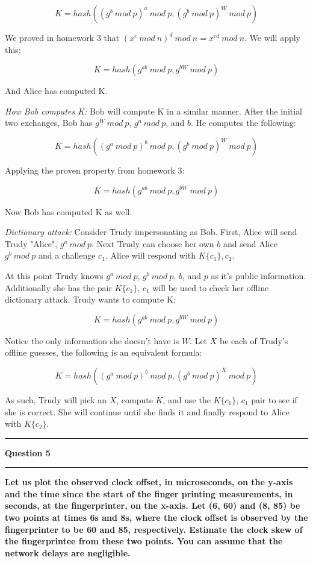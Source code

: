\documentclass[11pt]{article}
\newcommand\question[2]{\vspace{.25in}\hrule\textbf{#1}\vspace{.5em}\hrule\vspace{.10in}}
\renewcommand\part[1]{\vspace{.10in}\textbf{(#1)}}
\begin{document}
$$K = hash((g^b \ mod \ p)^a \ mod \ p, (g^b \ mod \ p)^W \ mod \ p)$$

We proved in homework 3 that $(x^c \ mod \ n)^d \ mod \ n = x^{cd} \ mod \ n$. We will apply this:

$$K = hash(g^{ab} \ mod \ p, g^{bW} \ mod \ p)$$

And Alice has computed K.

\textit{How Bob computes K:} Bob will compute K in a similar manner. After the initial two exchanges, Bob has $g^W \ mod \ p$, $g^a \ mod \ p$, and $b$. He computes the following:

$$K = hash((g^a \ mod \ p)^b \ mod \ p, (g^b \ mod \ p)^W \ mod \ p)$$

Applying the proven property from homework 3:


$$K = hash(g^{ab} \ mod \ p, g^{bW} \ mod \ p)$$

Now Bob has computed K as well.

\textit{Dictionary attack:} Consider Trudy impersonating as Bob. First, Alice will send Trudy "Alice", $g^a \ mod \ p$. Next Trudy can choose her own $b$ and send Alice $g^b \ mod \ p$ and a challenge $c_1$. Alice will respond with $K\{c_1\}, c_2$.

At this point Trudy knows $g^a \ mod \ p$, $g^b \ mod \ p$, $b$, and $p$ as it's public information. Additionally she has the pair $K\{c_1\}$, $c_1$ will be used to check her offline dictionary attack. Trudy wants to compute K:

$$K = hash(g^{ab} \ mod \ p, g^{bW} \ mod \ p)$$

Notice the only information she doesn't have is $W$. Let $X$ be each of Trudy's offline guesses, the following is an equivalent formula:

$$K = hash((g^a \ mod \ p)^b \ mod \ p, (g^b \ mod \ p)^X \ mod \ p)$$

As such, Trudy will pick an $X$, compute $K$, and use the $K\{c_1\}$, $c_1$ pair to see if she is correct. She will continue until she finds it and finally respond to Alice with $K\{c_2\}$.


\question{Question 5}

\part{a} \textbf{Let us plot the observed clock offset, in microseconds, on the y-axis and the time since the start of the finger printing measurements, in seconds, at the fingerprinter, on the x-axis. Let (6, 60) and (8, 85) be two points at times 6s and 8s, where the clock offset is observed by the fingerprinter to be 60 and 85, respectively. Estimate the clock skew of the fingerprintee from these two points. You can assume that the network delays are negligible.} 
\end{document}
